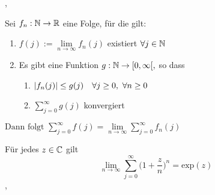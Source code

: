\sep

\Satz[2.7.28] Sei $f_n : \mathbb{N} \rightarrow \mathbb{R}$ eine Folge, für die gilt:
\begin{enumerate}
\item[(1)] $ f(j) :=  \lim\limits_{n \rightarrow \infty} f_n(j) $ existiert $\forall j \in \mathbb{N}$ 
\item[(2)] Es gibt eine Funktion $g : \mathbb{N} \rightarrow [0, \infty[,$ so dass
\begin{enumerate}
\item[(2.1)] $\left\lvert f_n(j) \right\rvert \leq g(j) \quad \forall j \geq 0, \ \forall n \geq 0$
\item[(2.2)] $\sum_{j=0}^{\infty} g(j)$ konvergiert
\end{enumerate}
\end{enumerate}

\( \text{Dann folgt } \sum_{j=0}^{\infty} f(j) =  \lim\limits_{n \rightarrow \infty} \sum_{j=0}^{\infty} f_n(j) \)

\Korollar[2.7.29] Für jedes $z \in \mathbb{C}$ gilt
\[\lim\limits_{n \rightarrow \infty} \sum_{j=0}^{\infty} \bigg(1 + \frac{z}{n} \bigg)^n = \text{exp}(z) \]
\sep